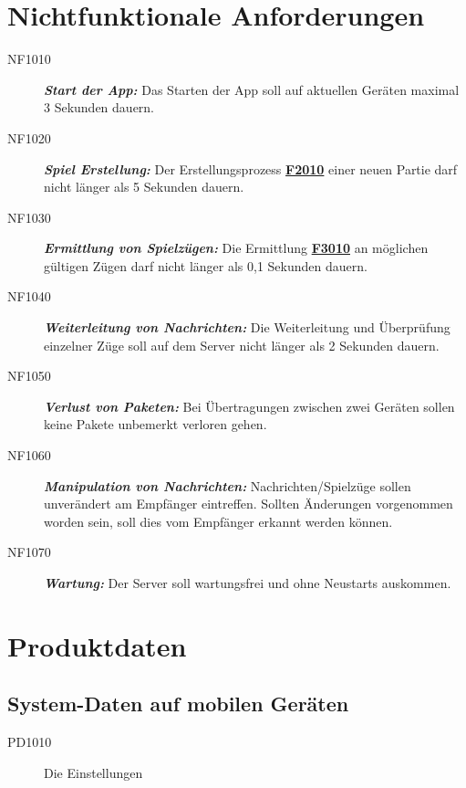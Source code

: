 \documentclass[parskip=full]{scrartcl}
\begin{document}
\section{Nichtfunktionale Anforderungen}
\begin{description}
	
	\item[NF1010] \textbf{\textit{Start der App: }} Das Starten der App soll auf aktuellen Geräten maximal 3 Sekunden dauern. 
	\item[NF1020] \textbf{\textit{Spiel Erstellung: }} Der Erstellungsprozess \hyperlink{F2010}{\textbf{F2010}} einer neuen Partie darf nicht länger als 5 Sekunden dauern.
	\item[NF1030] \textbf{\textit{Ermittlung von Spielzügen: }} Die Ermittlung \hyperlink{F3010}{\textbf{F3010}} an möglichen gültigen Zügen darf nicht länger als 0,1 Sekunden dauern.
	\item[NF1040] \textbf{\textit{Weiterleitung von Nachrichten: }} Die Weiterleitung und Überprüfung einzelner Züge soll auf dem Server nicht länger als 2 Sekunden dauern.
	\item[NF1050] \textbf{\textit{Verlust von Paketen: }} Bei Übertragungen zwischen zwei Geräten sollen keine Pakete unbemerkt verloren gehen.
	\item[NF1060] \textbf{\textit{Manipulation von Nachrichten: }} Nachrichten/Spielzüge sollen unverändert am Empfänger eintreffen. Sollten Änderungen vorgenommen worden sein, soll dies vom Empfänger erkannt werden können.
	\item[NF1070] \textbf{\textit{Wartung: }} Der Server soll wartungsfrei und ohne Neustarts auskommen.

	
\end{description}

\newpage
\section{Produktdaten}

\subsection{System-Daten auf mobilen Geräten}
\begin{description}
	
	\item[PD1010] Die Einstellungen


\end{description}
\end{document}
